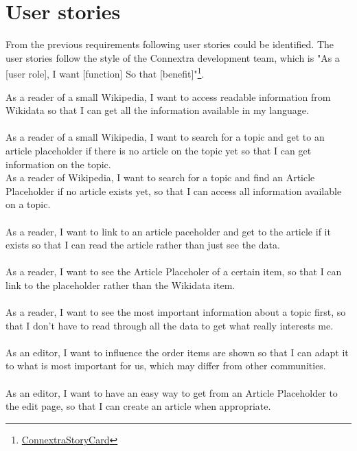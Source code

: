 \section{User stories}

From the previous requirements following user stories could be identified. The user stories follow the style of the Connextra development team, which is "As a [user role], I want [function] So that [benefit]"\footnote{\href{http://agilecoach.typepad.com/photos/connextra_user_story_2001/connextrastorycard.html}{ConnextraStoryCard}}. \\


As a reader of a small Wikipedia, I want to access readable information from Wikidata so that I can get all the information available in my language. \\
\\
As a reader of a small Wikipedia, I want to search for a topic and get to an article placeholder if there is no article on the topic yet so that I can get information on the topic. \\ As a reader of Wikipedia, I want to search for a topic and find an Article Placeholder if no article exists yet, so that I can access all information available on a topic. \\
\\
As a reader, I want to link to an article paceholder and get to the article if it exists so that I can read the article rather than just see the data. \\
\\
As a reader, I want to see the Article Placeholer of a certain item, so that I can link to the placeholder rather than the Wikidata item. \\
\\
As a reader, I want to see the most important information about a topic first, so that I don't have to read through all the data to get what really interests me. \\
\\
As an editor, I want to influence the order items are shown so that I can adapt it to what is most important for us, which may differ from other communities.\\
\\
As an editor, I want to have an easy way to get from an Article Placeholder to the edit page, so that I can create an article when appropriate. \\
